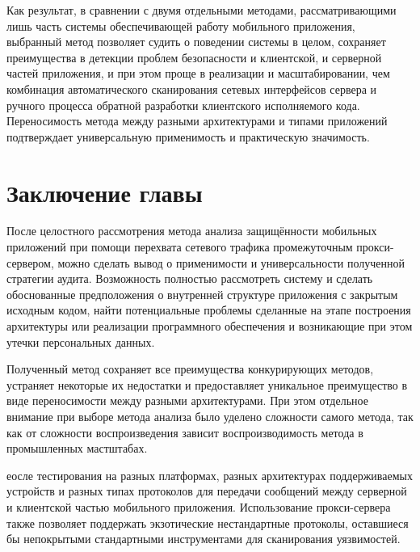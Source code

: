 Как результат, в сравнении с двумя отдельными методами, рассматривающими лишь часть системы обеспечивающей работу мобильного приложения, выбранный метод позволяет судить о поведении системы в целом, сохраняет преимущества в детекции проблем безопасности и клиентской, и серверной частей приложения, и при этом проще в реализации и масштабировании, чем комбинация автоматического сканирования сетевых интерфейсов сервера и ручного процесса обратной разработки клиентского исполняемого кода. Переносимость метода между разными архитектурами и типами приложений подтверждает универсальную применимость и практическую значимость.

\section{Заключение главы}

После целостного рассмотрения метода анализа защищённости мобильных приложений при помощи перехвата сетевого трафика промежуточным прокси-сервером, можно сделать вывод о применимости и универсальности полученной стратегии аудита. Возможность полностью рассмотреть систему и сделать обоснованные предположения о внутренней структуре приложения с закрытым исходным кодом, найти потенциальные проблемы сделанные на этапе построения архитектуры или реализации программного обеспечения и возникающие при этом утечки персональных данных.

Полученный метод сохраняет все преимущества конкурирующих методов, устраняет некоторые их недостатки и предоставляет уникальное преимущество в виде переносимости между разными архитектурами. При этом отдельное внимание при выборе метода анализа было уделено сложности самого метода, так как от сложности воспроизведения зависит воспроизводимость метода в промышленных мастштабах.

еосле тестирования на разных платформах, разных архитектурах поддерживаемых устройств и разных типах протоколов для передачи сообщений между серверной и клиентской частью мобильного приложения. Использование прокси-сервера также позволяет поддержать экзотические нестандартные протоколы, оставшиеся бы непокрытыми стандартными инструментами для сканирования уязвимостей.


